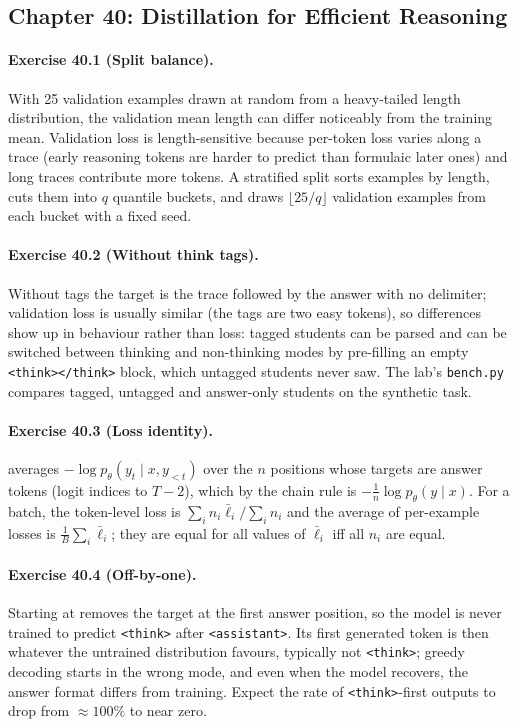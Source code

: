 \subsection*{Chapter 40: Distillation for Efficient Reasoning}

\paragraph{Exercise 40.1 (Split balance).}
With 25 validation examples drawn at random from a heavy-tailed length distribution, the
validation mean length can differ noticeably from the training mean. Validation loss is
length-sensitive because per-token loss varies along a trace (early reasoning tokens are harder
to predict than formulaic later ones) and long traces contribute more tokens. A stratified split
sorts examples by length, cuts them into $q$ quantile buckets, and draws
$\lfloor 25/q\rfloor$ validation examples from each bucket with a fixed seed.

\paragraph{Exercise 40.2 (Without think tags).}
Without tags the target is the trace followed by the answer with no delimiter; validation loss
is usually similar (the tags are two easy tokens), so differences show up in behaviour rather
than loss: tagged students can be parsed and can be switched between thinking and non-thinking
modes by pre-filling an empty \texttt{<think></think>} block, which untagged students never saw.
The lab's \texttt{bench.py} compares tagged, untagged and answer-only students on the synthetic
task.

\paragraph{Exercise 40.3 (Loss identity).}
 averages $-\log p_\theta(y_t\mid x,y_{<t})$ over the $n$ positions whose
targets are answer tokens (logit indices  to $T-2$), which by the chain rule is
$-\frac1n\log p_\theta(y\mid x)$. For a batch, the token-level loss is
$\sum_i n_i\bar\ell_i/\sum_i n_i$ and the average of per-example losses is $\frac1B\sum_i\bar\ell_i$;
they are equal for all values of $\bar\ell_i$ iff all $n_i$ are equal.

\paragraph{Exercise 40.4 (Off-by-one).}
Starting at  removes the target at the first answer position, so the model is
never trained to predict \texttt{<think>} after \texttt{<assistant>}. Its first generated token is
then whatever the untrained distribution favours, typically not \texttt{<think>}; greedy decoding
starts in the wrong mode, and even when the model recovers, the answer format differs from
training. Expect the rate of \texttt{<think>}-first outputs to drop from $\approx100\%$ to near zero.

